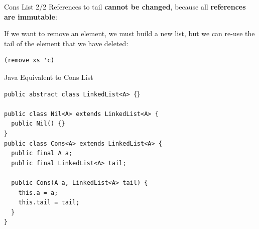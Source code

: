 \documentclass{beamer}
\begin{document}
\begin{frame}[fragile]{Cons List 2/2}
References to tail \textbf{cannot be changed}, because all \textbf{references are immutable}:

\vspace{.5cm}


\pause{} \vspace{.5cm}

If we want to remove an element, we must build a new list, but we can re-use the tail of the element that we have deleted:

\begin{lstlisting}
(remove xs 'c)
\end{lstlisting}

\pause{}

\end{frame}

\begin{frame}[fragile]{Java Equivalent to Cons List}
\begin{lstlisting}[style=Java]
public abstract class LinkedList<A> {}

public class Nil<A> extends LinkedList<A> {
  public Nil() {}
}
public class Cons<A> extends LinkedList<A> {
  public final A a;
  public final LinkedList<A> tail;

  public Cons(A a, LinkedList<A> tail) {
    this.a = a;
    this.tail = tail;
  }
}
\end{lstlisting}
\end{frame}
\end{document}
